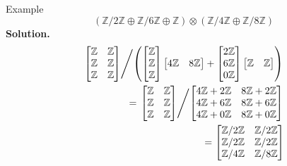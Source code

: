 \documentclass{beamer}
\begin{document}
\begin{frame}{Example}
    \[(\mathbb{Z}/2\mathbb{Z}\oplus \mathbb{Z}/6\mathbb{Z}\oplus \mathbb{Z})\otimes (\mathbb{Z}/4\mathbb{Z}\oplus \mathbb{Z}/8\mathbb{Z})\]
    \textbf{Solution.}
    \begin{align*}
        \left.
            \begin{bmatrix}\mathbb{Z} & \mathbb{Z}\\ \mathbb{Z} & \mathbb{Z} \\ \mathbb{Z} & \mathbb{Z} \end{bmatrix}
            \middle/
        \left(
            \begin{bmatrix} \mathbb{Z} \\ \mathbb{Z}\\ \mathbb{Z}\end{bmatrix}
        \begin{bmatrix} 4\mathbb{Z} & 8\mathbb{Z}\end{bmatrix}
        +
        \begin{bmatrix} 2\mathbb{Z} \\ 6\mathbb{Z}\\ 0\mathbb{Z}\end{bmatrix}
        \begin{bmatrix} \mathbb{Z} & \mathbb{Z}\end{bmatrix}\right)
        \right.\\
        =
        \left.
            \begin{bmatrix}\mathbb{Z} & \mathbb{Z}\\ \mathbb{Z} & \mathbb{Z} \\ \mathbb{Z} & \mathbb{Z} \end{bmatrix}
            \middle/
            \begin{bmatrix}4\mathbb{Z}+2\mathbb{Z} & 8\mathbb{Z}+2\mathbb{Z}\\ 4\mathbb{Z}+6\mathbb{Z} & 8\mathbb{Z}+6\mathbb{Z} \\ 4\mathbb{Z}+0\mathbb{Z} & 8\mathbb{Z}+0\mathbb{Z} \end{bmatrix}
        \right.\\
        =
        \begin{bmatrix}\mathbb{Z}/2\mathbb{Z} & \mathbb{Z}/2\mathbb{Z}\\ \mathbb{Z}/2\mathbb{Z} & \mathbb{Z}/2\mathbb{Z} \\ \mathbb{Z}/4\mathbb{Z} & \mathbb{Z}/8\mathbb{Z} \end{bmatrix}
    \end{align*}
\end{frame}
\end{document}
